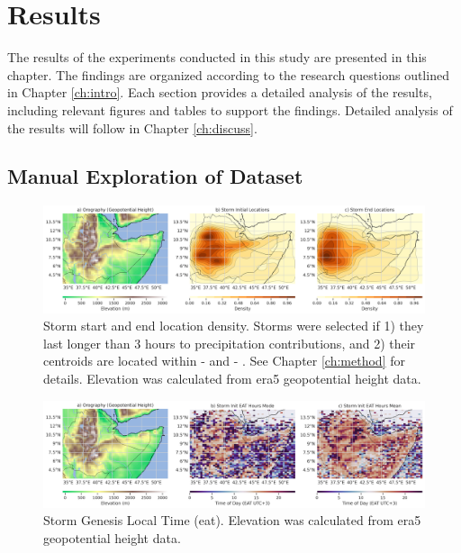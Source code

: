 \chapter{Results}
\label{ch:results}

The results of the experiments conducted in this study are presented in this chapter. The findings are organized according to the research questions outlined in Chapter \ref{ch:intro}. Each section provides a detailed analysis of the results, including relevant figures and tables to support the findings. Detailed analysis of the results will follow in Chapter \ref{ch:discuss}.

\section{Manual Exploration of Dataset}

\begin{figure}[ht]
    \centering
    \includegraphics[width=\textwidth]{../figures/generated/exploration/orography_storm_init_end_kde.png}
    \caption{Storm start and end location density. Storms were selected if 1) they last longer than 3 hours to precipitation contributions, and 2) their centroids are located within  -  and  -  \citep{Hill2023}. See Chapter \ref{ch:method} for details. Elevation was calculated from \acrshort{era5} geopotential height data.}
    \label{fig:orography_storm_init_end_kde}
\end{figure}

\begin{figure}[ht]
    \centering
    \includegraphics[width=\textwidth]{../figures/generated/exploration/orography_storm_init_eat_hours_mode_mean.png}
    \caption{Storm Genesis Local Time (\acrlong{eat}). Elevation was calculated from \acrshort{era5} geopotential height data.}
    \label{fig:orography_storm_init_eat_hours_mode_mean}
\end{figure}

